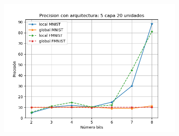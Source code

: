 \begin{figure}[H]
\begin{subfigure}[H]{0.45\textwidth}
    \includegraphics[width=\textwidth]{imagenes/HSIC/Precision con arquitectura: 5 capa 20 unidades.png} 
    \end{subfigure}
\end{figure}

